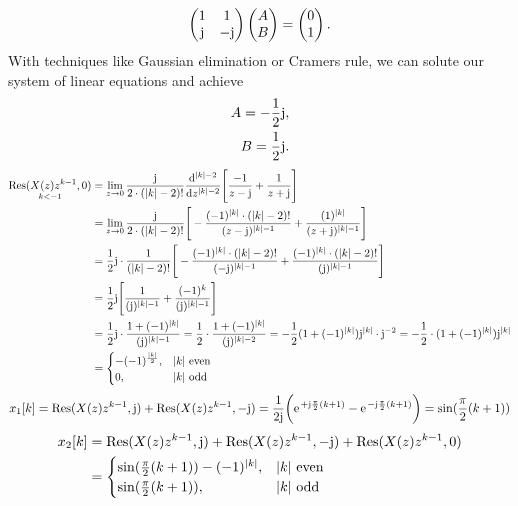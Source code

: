 \begin{align}
	\begin{pmatrix}
		1 & 1 \\
		\im & -\im
	\end{pmatrix}
	\begin{pmatrix}
		A \\
		B
	\end{pmatrix}
	=
	\begin{pmatrix}
		0 \\
		1
	\end{pmatrix}.
\end{align}
With techniques like Gaussian elimination or Cramers rule, we can solute our system of linear equations and achieve
\begin{align}
	A= -\frac{1}{2}\im, \nonumber \\
	B = \frac{1}{2}\im.
\end{align}
\begin{align}
	\underset{k<-1}{\mathrm{Res}(X(z)z^{k-1},0)}&=\lim\limits_{z\rightarrow0}\frac{\im}{2\cdot(|k|-2)!}\frac{\mathrm{d}^{|k|-2}}{\mathrm{d}z^{|k|-2}}\Bigg [\frac{-1}{z-\im}+\frac{1}{z+\im} \Bigg ] \nonumber \\
	&=\lim\limits_{z\rightarrow0}\frac{\im}{2\cdot(|k|-2)!}\Bigg [-\frac{(-1)^{|k|}\cdot(|k|-2)!}{(z-\im)^{|k|-1}}+\frac{(1)^{|k|}}{(z+\im)^{|k|-1}} \Bigg]\nonumber\\
	&=\frac{1}{2}\im \cdot\frac{1}{(|k|-2)!}\Bigg [-\frac{(-1)^{|k|}\cdot(|k|-2)!}{(-\im)^{|k|-1}}+\frac{(-1)^{|k|}\cdot(|k|-2)!}{(\im)^{|k|-1}}\Bigg] \nonumber \\
	&=\frac{1}{2}\im\Bigg[\frac{1}{(\im)^{|k|-1}}+\frac{(-1)^{k}}{(\im)^{|k|-1}}\Bigg ] \nonumber \\
	&=\frac{1}{2}\im\cdot\frac{1+(-1)^{|k|}}{(\im)^{|k|-1}}=\frac{1}{2}\cdot\frac{1+(-1)^{|k|}}{(\im)^{|k|-2}}=-\frac{1}{2}(1+(-1)^{|k|})\im^{|k|}\cdot\im^{-2}=-\frac{1}{2}\cdot(1+(-1)^{|k|})\im^{|k|} \nonumber \\
	&=\begin{cases}
		-(-1)^{\frac{|k|}{2}}, &|k|\text{ even} \\
		0, &|k|\text{ odd}
	\end{cases}
\end{align}
\begin{align}
	x_1[k]=\mathrm{Res}(X(z)z^{k-1},\im)+\mathrm{Res}(X(z)z^{k-1},-\im)=\frac{1}{2\im}\bigg(\e^{+\im\frac{\pi}{2}(k+1)}-\e^{-\im\frac{\pi}{2}(k+1)}\bigg )=\sin(\frac{\pi}{2}(k+1))
\end{align}
\begin{align}
	x_2[k]&=\mathrm{Res}(X(z)z^{k-1},\im)+\mathrm{Res}(X(z)z^{k-1},-\im)+\mathrm{Res}(X(z)z^{k-1},0) \nonumber \\
	&=\begin{cases}
		\sin(\frac{\pi}{2}(k+1))-(-1)^{|k|}, &|k| \text{ even} \\
		\sin(\frac{\pi}{2}(k+1)), &|k| \text{ odd}
	\end{cases}
\end{align}
